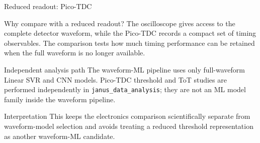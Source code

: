 \begin{frame}{Reduced readout: Pico-TDC}

\small

\begin{block}{Why compare with a reduced readout?}
The oscilloscope gives access to the complete detector waveform, while the Pico-TDC records a compact set of timing observables. The comparison tests how much timing performance can be retained when the full waveform is no longer available.
\end{block}

\begin{block}{Independent analysis path}
The waveform-ML pipeline uses only full-waveform Linear SVR and CNN models. Pico-TDC threshold and ToT studies are performed independently in \texttt{janus\_data\_analysis}; they are not an ML model family inside the waveform pipeline.
\end{block}

\begin{alertblock}{Interpretation}
This keeps the electronics comparison scientifically separate from waveform-model selection and avoids treating a reduced threshold representation as another waveform-ML candidate.
\end{alertblock}

\end{frame}
